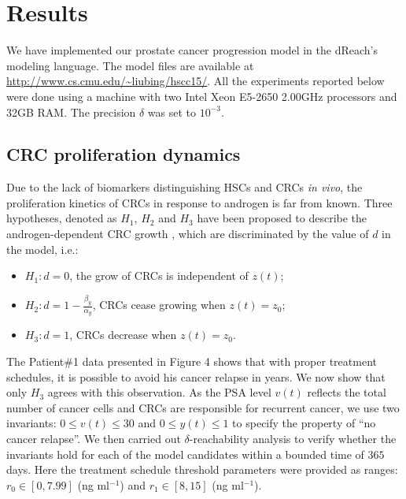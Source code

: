 \section{Results}\label{sec.results}

We have implemented our prostate cancer progression model in the dReach's modeling language. The model files are available at \url{http://www.cs.cmu.edu/~liubing/hscc15/}. All the experiments reported below were done using a machine with two Intel Xeon E5-2650 2.00GHz processors and 32GB RAM. The precision $\delta$ was set to $10^{-3}$. 

\subsection{CRC proliferation dynamics}
Due to the lack of biomarkers distinguishing HSCs and CRCs \textit{in vivo}, the proliferation kinetics of CRCs in response to androgen is far from known. Three hypotheses, denoted as $H_1$, $H_2$ and $H_3$ have been proposed to describe the androgen-dependent CRC growth \cite{ideta08}, which are discriminated by the value of $d$ in the model, i.e.:
 \vspace{-0.3cm}
\begin{itemize}
\item $H_1: d = 0$, the grow of CRCs is independent of $z(t)$;
\item $H_2: d = 1-\frac{\beta_y}{\alpha_y}$, CRCs cease growing when $z(t)=z_0$;
\item $H_3: d = 1$, CRCs decrease when $z(t)=z_0$.
\end{itemize} 
 \vspace{-0.3cm}

The Patient\#1 data presented in Figure 4 shows that with proper treatment schedules, it is possible to avoid his cancer relapse in years. We now show that only $H_3$ agrees with this observation. As the PSA level $v(t)$ reflects the total number of cancer cells and CRCs are responsible for recurrent cancer, we use two invariants: $0 \le v(t) \le 30$ and $0 \le y(t) \le 1$ to specify the property of ``no cancer relapse''. We then carried out $\delta$-reachability analysis to verify whether the invariants hold for each of the model candidates within a bounded time of $365$ days. Here the treatment schedule threshold parameters were provided as ranges: $r_0 \in [0, 7.99]$ (ng ml$^{-1}$) and $r_1 \in [8,15]$ (ng ml$^{-1}$).


